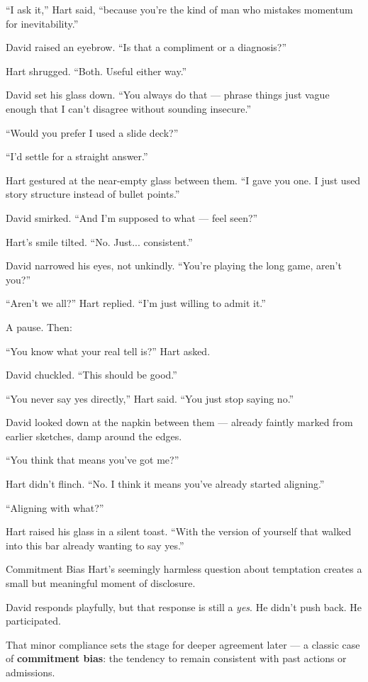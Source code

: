 “I ask it,” Hart said, “because you’re the kind of man who mistakes momentum for inevitability.”

David raised an eyebrow. “Is that a compliment or a diagnosis?”

Hart shrugged. “Both. Useful either way.”

David set his glass down. “You always do that — phrase things just vague enough that I can't disagree without sounding insecure.”

“Would you prefer I used a slide deck?”

“I’d settle for a straight answer.”

Hart gestured at the near-empty glass between them. “I gave you one. I just used story structure instead of bullet points.”

David smirked. “And I’m supposed to what — feel seen?”

Hart’s smile tilted. “No. Just... consistent.”

David narrowed his eyes, not unkindly. “You’re playing the long game, aren’t you?”

“Aren’t we all?” Hart replied. “I’m just willing to admit it.”

A pause. Then:

“You know what your real tell is?” Hart asked.

David chuckled. “This should be good.”

“You never say yes directly,” Hart said. “You just stop saying no.”

David looked down at the napkin between them — already faintly marked from earlier sketches, damp around the edges.

“You think that means you’ve got me?”

Hart didn’t flinch. “No. I think it means you’ve already started aligning.”

“Aligning with what?”

Hart raised his glass in a silent toast. “With the version of yourself that walked into this bar already wanting to say yes.”

\begin{PsychologicalSidebar}{Commitment Bias}
Hart's seemingly harmless question about temptation creates a small but meaningful moment of disclosure.

David responds playfully, but that response is still a \textit{yes}. He didn’t push back. He participated.

That minor compliance sets the stage for deeper agreement later — a classic case of \textbf{commitment bias}: 
the tendency to remain consistent with past actions or admissions.
\end{PsychologicalSidebar}



